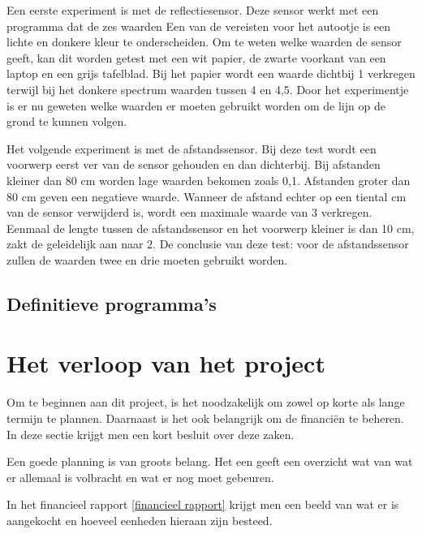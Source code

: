 \documentclass[a4paper,twoside,kulak]{kulakreport} %
\begin{document}
Een eerste experiment is met de reflectiesensor. Deze sensor werkt met een programma dat de zes waarden %
Een van de vereisten voor het autootje is een lichte en donkere kleur te onderscheiden. Om te weten welke waarden de sensor geeft, kan dit worden getest met een wit papier, de zwarte voorkant van een laptop en een grijs tafelblad. Bij het papier wordt een waarde dichtbij 1 verkregen terwijl bij het donkere spectrum waarden tussen 4 en 4,5. %
Door het experimentje is er nu geweten welke waarden er moeten gebruikt worden om de lijn op de grond te kunnen volgen.

Het volgende experiment is met de afstandssensor. Bij deze test wordt een voorwerp eerst ver van de sensor gehouden en dan dichterbij. Bij afstanden kleiner dan 80 cm worden lage waarden bekomen zoals 0,1. Afstanden groter dan 80 cm geven een negatieve waarde. Wanneer de afstand echter op een tiental cm van de sensor verwijderd is, wordt een maximale waarde van 3 verkregen. Eenmaal de lengte tussen de afstandssensor en het voorwerp kleiner is dan 10 cm, zakt de geleidelijk aan naar 2. De conclusie van deze test: voor de afstandssensor zullen de waarden twee en drie moeten gebruikt worden.

\subsection{Definitieve programma's}



\section{Het verloop van het project}
Om te beginnen aan dit project, is het noodzakelijk om zowel op korte als lange termijn te plannen. Daarnaast is het ook belangrijk om de financiën te beheren. In deze sectie krijgt men een kort besluit over deze zaken.

Een goede planning is van groots belang. Het een geeft een overzicht wat van wat er allemaal is volbracht en wat er nog moet gebeuren.%

In het financieel rapport \ref{financieel rapport} krijgt men een beeld van wat er is aangekocht en hoeveel eenheden hieraan zijn besteed. 
\end{document}
